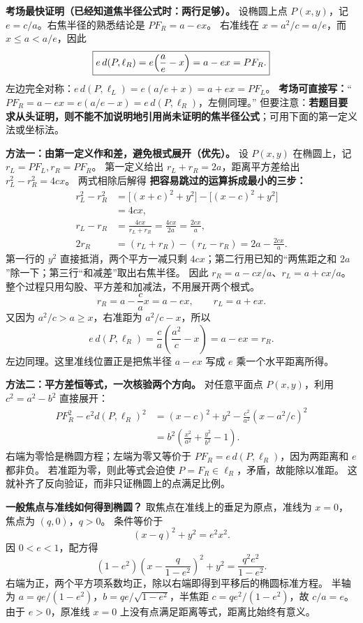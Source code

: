 \begin{proofbox}
\textbf{考场最快证明（已经知道焦半径公式时：两行足够）。}
设椭圆上点 $P(x,y)$，记 $e=c/a$。右焦半径的熟悉结论是 $PF_R=a-ex$。
右准线在 $x=a^2/c=a/e$，而 $x\le a<a/e$，因此
\[
\boxed{e\,d(P,\ell_R)=e\Bigl(\frac{a}{e}-x\Bigr)=a-ex=PF_R.}
\]
左边完全对称：$e\,d(P,\ell_L)=e(a/e+x)=a+ex=PF_L$。
\textbf{考场可直接写：}“$PF_R=a-ex=e(a/e-x)=e\,d(P,\ell_R)$，左侧同理。”
但要注意：\textbf{若题目要求从头证明，则不能不加说明地引用尚未证明的焦半径公式}；可用下面的第一定义法或坐标法。
\end{proofbox}
\clearpage
\begin{proofbox}
\textbf{方法一：由第一定义作和差，避免根式展开（优先）。}
设 $P(x,y)$ 在椭圆上，记 $r_L=PF_L,r_R=PF_R$。
第一定义给出 $r_L+r_R=2a$，距离平方差给出 $r_L^2-r_R^2=4cx$。
两式相除后解得
\textbf{把容易跳过的运算拆成最小的三步：}
\[
\begin{aligned}
r_L^2-r_R^2
&=\bigl[(x+c)^2+y^2\bigr]-\bigl[(x-c)^2+y^2\bigr]\\
&=4cx,\\
r_L-r_R&=\frac{4cx}{r_L+r_R}=\frac{4cx}{2a}=\frac{2cx}{a},\\
2r_R&=(r_L+r_R)-(r_L-r_R)=2a-\frac{2cx}{a}.
\end{aligned}
\]
第一行的 $y^2$ 直接抵消，两个平方一减只剩 $4cx$；第二行用已知的“两焦距之和 $2a$”除一下；第三行“和减差”取出右焦半径。
因此 $r_R=a-cx/a$、$r_L=a+cx/a$。整个过程只用勾股、平方差和加减法，不用展开两个根式。
\[
r_R=a-\frac ca x=a-ex,\qquad r_L=a+ex.
\]
又因为 $a^2/c>a\ge x$，右准距为 $a^2/c-x$，所以
\[
e\,d(P,\ell_R)=\frac ca\left(\frac{a^2}{c}-x\right)=a-ex=r_R.
\]
左边同理。这里准线位置正是把焦半径 $a-ex$ 写成 $e$ 乘一个水平距离所得。

\textbf{方法二：平方差恒等式，一次核验两个方向。}
对任意平面点 $P(x,y)$，利用 $c^2=a^2-b^2$ 直接展开：
\[
\begin{aligned}
PF_R^2-e^2d(P,\ell_R)^2
&=(x-c)^2+y^2-\frac{c^2}{a^2}(x-a^2/c)^2\\
&=b^2\left(\frac{x^2}{a^2}+\frac{y^2}{b^2}-1\right).
\end{aligned}
\]
右端为零恰是椭圆方程；左端为零又等价于 $PF_R=e\,d(P,\ell_R)$，因为两距离和 $e$ 都非负。
若准距为零，则此等式会迫使 $P=F_R\in\ell_R$，矛盾，故能除以准距。
这就补齐了反向验证，而非只证椭圆上的点满足比例。
\end{proofbox}
\clearpage
\begin{proofbox}
\textbf{一般焦点与准线如何得到椭圆？}
取焦点在准线上的垂足为原点，准线为 $x=0$，焦点为 $(q,0)$，$q>0$。
条件等价于
\[
(x-q)^2+y^2=e^2x^2.
\]
因 $0<e<1$，配方得
\[
(1-e^2)\left(x-\frac{q}{1-e^2}\right)^2+y^2
=\frac{q^2e^2}{1-e^2}.
\]
右端为正，两个平方项系数均正，除以右端即得到平移后的椭圆标准方程。
半轴为 $a=qe/(1-e^2)$，$b=qe/\sqrt{1-e^2}$，半焦距 $c=qe^2/(1-e^2)$，故 $c/a=e$。
由于 $e>0$，原准线 $x=0$ 上没有点满足距离等式，距离比始终有意义。
\end{proofbox}

